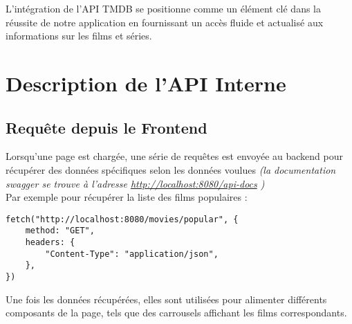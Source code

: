 \documentclass[a4paper]{article}
\begin{document}
L'intégration de l'API TMDB se positionne comme un élément clé dans la réussite de notre application en fournissant un accès fluide et actualisé aux informations sur les films et séries.

\newpage

\section{Description de l'API Interne}

\subsection{Requête depuis le Frontend}
Lorsqu'une page est chargée, une série de requêtes est envoyée au backend pour récupérer des données spécifiques selon les données voulues \textit{(la documentation swagger se trouve à l'adresse \href{http://localhost:8080/api-docs} {http://localhost:8080/api-docs} )}
\\
Par exemple pour récupérer la liste des films populaires : \\
    \begin{lstlisting}
fetch("http://localhost:8080/movies/popular", {
    method: "GET",
    headers: {
        "Content-Type": "application/json",
    },
})
    \end{lstlisting}
Une fois les données récupérées, elles sont utilisées pour alimenter différents composants de la page, tels que des carrousels affichant les films correspondants.
\end{document}
